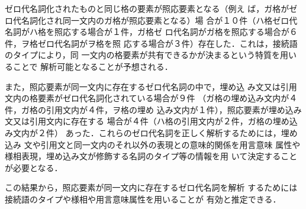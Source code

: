 ゼロ代名詞化されたものと同じ格の要素が照応要素となる（例え
ば，ガ格がゼロ代名詞化され同一文内のガ格が照応要素となる）場
合が１０件（ハ格ゼロ代名詞がハ格を照応する場合が１件，ガ格ゼ
ロ代名詞がガ格を照応する場合が６件，ヲ格ゼロ代名詞がヲ格を照
応する場合が３件）存在した．これは，接続語のタイプにより，同
一文内の格要素が共有できるかが決まるという特質を用いることで
解析可能となることが予想される．

また，照応要素が同一文内に存在するゼロ代名詞の中で，埋め込
み文又は引用文内の格要素がゼロ代名詞化されている場合が９件
（ガ格の埋め込み文内が４件，ガ格の引用文内が４件，ヲ格の埋め
込み文内が１件），照応要素が埋め込み文又は引用文内に存在する
場合が４件（ハ格の引用文内が２件，ガ格の埋め込み文内が２件）
あった．これらのゼロ代名詞を正しく解析するためには，埋め込み
文や引用文と同一文内のそれ以外の表現との意味的関係を用言意味
属性や様相表現，埋め込み文が修飾する名詞のタイプ等の情報を用
いて決定することが必要となる．

この結果から，照応要素が同一文内に存在するゼロ代名詞を解析
するためには接続語のタイプや様相や用言意味属性を用いることが
有効と推定できる．

